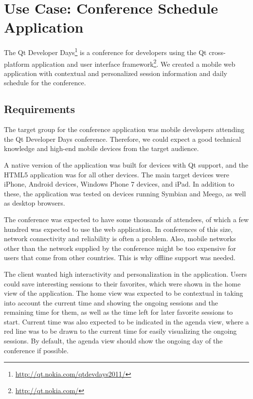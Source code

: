 \chapter{Use Case: Conference Schedule Application}
\label{chapter:methods}

The Qt Developer
Days\footnote{\url{http://qt.nokia.com/qtdevdays2011/}} is a
conference for developers using the Qt cross-platform application and
user interface framework\footnote{\url{http://qt.nokia.com/}}. We
created a mobile web application with contextual and personalized
session information and daily schedule for the conference.

\section{Requirements}

The target group for the conference application was mobile developers
attending the Qt Developer Days conference. Therefore, we could expect
a good technical knowledge and high-end mobile devices from the target
audience.

A native version of the application was built for devices with Qt
support, and the HTML5 application was for all other devices. The main
target devices were iPhone, Android devices, Windows Phone 7 devices,
and iPad. In addition to these, the application was tested on devices
running Symbian and Meego, as well as desktop browsers.

The conference was expected to have some thousands of attendees, of
which a few hundred was expected to use the web application. In
conferences of this size, network connectivity and reliability is
often a problem. Also, mobile networks other than the 
network supplied by the conference might be too expensive for users
that come from other countries. This is why offline support was
needed.

The client wanted high interactivity and personalization in the
application. Users could save interesting sessions to their favorites,
which were shown in the home view of the application. The home view
was expected to be contextual in taking into account the current time
and showing the ongoing sessions and the remaining time for them, as
well as the time left for later favorite sessions to start. Current
time was also expected to be indicated in the agenda view, where a red
line was to be drawn to the current time for easily visualizing the
ongoing sessions. By default, the agenda view should show the ongoing
day of the conference if possible.

